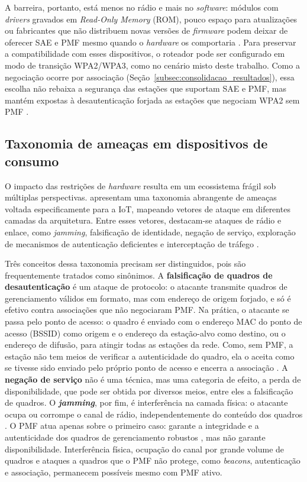 A barreira, portanto, está menos no rádio e mais no \textit{software}: módulos com \textit{drivers} gravados em \textit{Read-Only Memory} (ROM), pouco espaço para atualizações ou fabricantes que não distribuem novas versões de \textit{firmware} podem deixar de oferecer SAE e PMF mesmo quando o \textit{hardware} os comportaria \cite{Lima2025}. Para preservar a compatibilidade com esses dispositivos, o roteador pode ser configurado em modo de transição WPA2/WPA3, como no cenário misto deste trabalho. Como a negociação ocorre por associação (Seção~\ref{subsec:consolidacao_resultados}), essa escolha não rebaixa a segurança das estações que suportam SAE e PMF, mas mantém expostas à desautenticação forjada as estações que negociam WPA2 sem PMF \cite{Lima2025}.

\subsection{Taxonomia de ameaças em dispositivos de consumo}

O impacto das restrições de \textit{hardware} resulta em um ecossistema frágil sob múltiplas perspectivas.  apresentam uma taxonomia abrangente de ameaças voltada especificamente para a IoT, mapeando vetores de ataque em diferentes camadas da arquitetura. Entre esses vetores, destacam-se ataques de rádio e enlace, como \textit{jamming}, falsificação de identidade, negação de serviço, exploração de mecanismos de autenticação deficientes e interceptação de tráfego \cite{Hassija2019}.

Três conceitos dessa taxonomia precisam ser distinguidos, pois são frequentemente tratados como sinônimos. A \textbf{falsificação de quadros de desautenticação} é um ataque de protocolo: o atacante transmite quadros de gerenciamento válidos em formato, mas com endereço de origem forjado, e só é efetivo contra associações que não negociaram PMF. Na prática, o atacante se passa pelo ponto de acesso: o quadro é enviado com o endereço MAC do ponto de acesso (BSSID) como origem e o endereço da estação-alvo como destino, ou o endereço de difusão, para atingir todas as estações da rede. Como, sem PMF, a estação não tem meios de verificar a autenticidade do quadro, ela o aceita como se tivesse sido enviado pelo próprio ponto de acesso e encerra a associação \cite{KohliosHayajneh2018}. A \textbf{negação de serviço} não é uma técnica, mas uma categoria de efeito, a perda de disponibilidade, que pode ser obtida por diversos meios, entre eles a falsificação de quadros. O \textbf{\textit{jamming}}, por fim, é interferência na camada física: o atacante ocupa ou corrompe o canal de rádio, independentemente do conteúdo dos quadros \cite{Hassija2019,Amoordon2022}. O PMF atua apenas sobre o primeiro caso: garante a integridade e a autenticidade dos quadros de gerenciamento robustos \cite{CiscoMFP2024}, mas não garante disponibilidade. Interferência física, ocupação do canal por grande volume de quadros e ataques a quadros que o PMF não protege, como \textit{beacons}, autenticação e associação, permanecem possíveis mesmo com PMF ativo.

